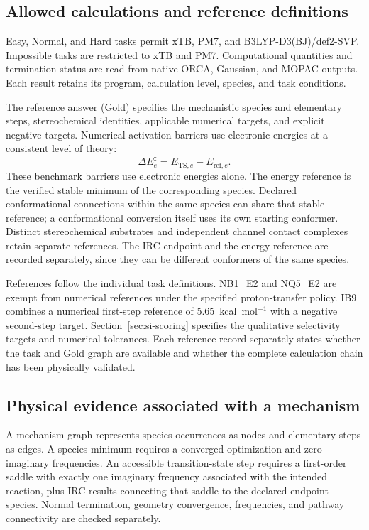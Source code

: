 

\subsection{Allowed calculations and reference definitions}
Easy, Normal, and Hard tasks permit xTB, PM7, and B3LYP-D3(BJ)/def2-SVP.\citep{gfn2xtb2019,pm72013,becke1993,lyp1988,stephens1994,d32010,d3bj2011,def22005} Impossible tasks are restricted to xTB and PM7. Computational quantities and termination status are read from native ORCA, Gaussian, and MOPAC outputs.\citep{orca2025,gaussian16,mopac2026,ref11} Each result retains its program, calculation level, species, and task conditions.

The reference answer (Gold) specifies the mechanistic species and elementary steps, stereochemical identities, applicable numerical targets, and explicit negative targets. Numerical activation barriers use electronic energies at a consistent level of theory:
\begin{equation}
\Delta E_e^{\ddagger}=E_{\mathrm{TS},e}-E_{\mathrm{ref},e}.
\label{eq:si-barrier}
\end{equation}
These benchmark barriers use electronic energies alone. The energy reference is the verified stable minimum of the corresponding species. Declared conformational connections within the same species can share that stable reference; a conformational conversion itself uses its own starting conformer. Distinct stereochemical substrates and independent channel contact complexes retain separate references. The IRC endpoint and the energy reference are recorded separately, since they can be different conformers of the same species.

References follow the individual task definitions. NB1\_E2 and NQ5\_E2 are exempt from numerical references under the specified proton-transfer policy. IB9 combines a numerical first-step reference of 5.65~kcal~mol$^{-1}$ with a negative second-step target. Section~\ref{sec:si-scoring} specifies the qualitative selectivity targets and numerical tolerances. Each reference record separately states whether the task and Gold graph are available and whether the complete calculation chain has been physically validated.

\subsection{Physical evidence associated with a mechanism}
A mechanism graph represents species occurrences as nodes and elementary steps as edges. A species minimum requires a converged optimization and zero imaginary frequencies. An accessible transition-state step requires a first-order saddle with exactly one imaginary frequency associated with the intended reaction, plus IRC results connecting that saddle to the declared endpoint species.\citep{ref09,ref10} Normal termination, geometry convergence, frequencies, and pathway connectivity are checked separately.

